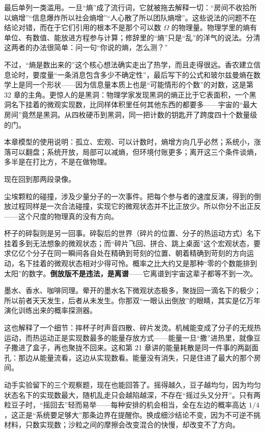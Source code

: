 最后单列一类滥用。一旦“熵”成了流行词，它就被拖去解释一切：“房间不收拾所以熵增”“信息爆炸所以社会熵增”“人心散了所以团队熵增”。这些说法的问题不在结论对错，而在于它们引用的根本不是那个可以数 \(\Omega\) 的物理量。物理学里的熵有单位、有数值、能放进方程参与计算；修辞里的“熵”只是“乱”的洋气的说法。分清这两者的办法很简单：问一句“你说的熵，怎么测？”

不过，“熵是数出来的”这个核心想法确实走出了热学，而且走得很远。香农建立信息论时，要度量“一条消息包含多少不确定性”，最后写下的公式和玻尔兹曼熵在数学上是同一个形状——因为信息量本质上也是“可能情形的个数”的对数，这是第 32 章的主角。更惊人的是黑洞：物理学家发现黑洞的熵正比于它表面积，一个黑洞名下挂着的微观实现数，比同样体积里任何其他东西的都要多——宇宙的“最大房间”竟然是黑洞。从四枚硬币到黑洞，同一把计数的钥匙开了跨度四十个数量级的门。

\begin{mainline}
本章模型的使用说明：孤立、宏观、可以计数时，熵增方向几乎必然；系统小，涨落可以翻盘；系统开放，局部可以减熵，但环境付账更多；离开这三个条件谈熵，多半是在打比方，不是在做物理。
\end{mainline}


现在回到那两段录像。

尘埃颗粒的碰撞，涉及少量分子的一次事件。把每个参与者的速度反演，得到的倒放过程同样是一次合法碰撞，实现它的微观状态并不比正放少。所以你分不出正反——这个尺度的物理真的没有方向。

杯子的碎裂则是另一回事。碎裂后的世界（碎片的位置、分子的热运动方式）名下挂着多到无法想象的微观状态；而“碎片飞回、拼合、跳上桌面”这个宏观状态，要求亿亿个分子在同一瞬间各自处在精确到苛刻的位置、朝着精确到苛刻的方向运动，名下挂着的微观状态相对少得可怜。概率之比大约又是那种“零的个数能排到太阳”的数字。\textbf{倒放版不是违法，是离谱}——它离谱到宇宙这辈子都等不到一次。

墨水、香水、咖啡同理。晕开的墨水名下微观状态极多，聚拢回一滴名下的极少；所以前者天天发生，后者从未发生。你那双“一眼认出倒放”的眼睛，其实是亿万年演化训练出来的概率探测器。

这也解释了一个细节：摔杯子时声音四散、碎片发烫。机械能变成了分子的无规热运动，而热运动正是实现数最多的能量存放方式——能量一旦“撒”进热里，就像豆子撒进了盒子，再也聚拢不回来。这和第 21 章讲的能量耗散是同一件事的两副面孔：那边从能量流看，这边从实现数看。能量没有消失，只是住进了最大的那个房间。

动手实验留下的三个观察题，现在也能回答了。摇得越久，豆子越均匀，因为均匀状态名下的实现数最大，随机乱走只会越陷越深，不存在“摇过头又分开”。只有两粒豆子时，“摇回去”轻而易举——每种安排的机会相当，全在左边的概率高达 \(1/4\)，这正是“系统要足够大”那条边界在提醒你。换成细沙结论不变，因为不可逆不挑材料，只数实现数；沙粒之间的摩擦会改变混合的快慢，却改变不了方向。

